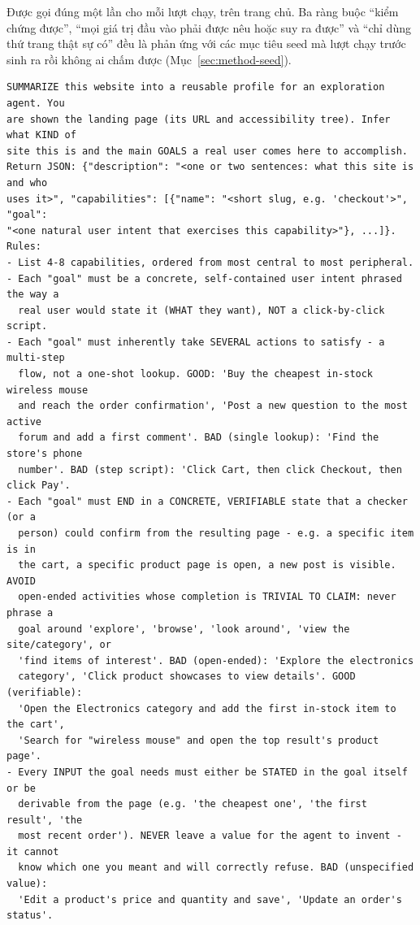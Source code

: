 Được gọi đúng một lần cho mỗi lượt chạy, trên trang chủ. Ba ràng buộc
``kiểm chứng được'', ``mọi giá trị đầu vào phải được nêu hoặc suy ra được'' và
``chỉ dùng thứ trang thật sự có'' đều là phản ứng với các mục tiêu seed mà
lượt chạy trước sinh ra rồi không ai chấm được (Mục~\ref{sec:method-seed}).

\begin{lstlisting}[style=mystyle,numbers=none,basicstyle=\scriptsize\ttfamily]
SUMMARIZE this website into a reusable profile for an exploration agent. You
are shown the landing page (its URL and accessibility tree). Infer what KIND of
site this is and the main GOALS a real user comes here to accomplish.
Return JSON: {"description": "<one or two sentences: what this site is and who
uses it>", "capabilities": [{"name": "<short slug, e.g. 'checkout'>", "goal":
"<one natural user intent that exercises this capability>"}, ...]}.
Rules:
- List 4-8 capabilities, ordered from most central to most peripheral.
- Each "goal" must be a concrete, self-contained user intent phrased the way a
  real user would state it (WHAT they want), NOT a click-by-click script.
- Each "goal" must inherently take SEVERAL actions to satisfy - a multi-step
  flow, not a one-shot lookup. GOOD: 'Buy the cheapest in-stock wireless mouse
  and reach the order confirmation', 'Post a new question to the most active
  forum and add a first comment'. BAD (single lookup): 'Find the store's phone
  number'. BAD (step script): 'Click Cart, then click Checkout, then click Pay'.
- Each "goal" must END in a CONCRETE, VERIFIABLE state that a checker (or a
  person) could confirm from the resulting page - e.g. a specific item is in
  the cart, a specific product page is open, a new post is visible. AVOID
  open-ended activities whose completion is TRIVIAL TO CLAIM: never phrase a
  goal around 'explore', 'browse', 'look around', 'view the site/category', or
  'find items of interest'. BAD (open-ended): 'Explore the electronics
  category', 'Click product showcases to view details'. GOOD (verifiable):
  'Open the Electronics category and add the first in-stock item to the cart',
  'Search for "wireless mouse" and open the top result's product page'.
- Every INPUT the goal needs must either be STATED in the goal itself or be
  derivable from the page (e.g. 'the cheapest one', 'the first result', 'the
  most recent order'). NEVER leave a value for the agent to invent - it cannot
  know which one you meant and will correctly refuse. BAD (unspecified value):
  'Edit a product's price and quantity and save', 'Update an order's status'.

\end{lstlisting}
